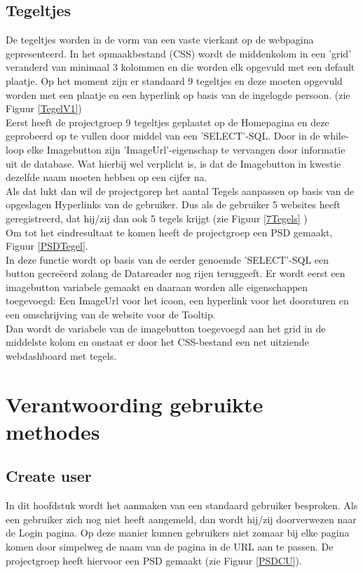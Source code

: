 \documentclass[11pt]{article}
\begin{document}
	
	
	
	\subsection{Tegeltjes}
	De tegeltjes worden in de vorm van een vaste vierkant op de webpagina gepresenteerd. 
	In het opmaakbestand (CSS) wordt de middenkolom in een 'grid' veranderd van minimaal 3 
	kolommen en die worden elk opgevuld met een default plaatje. Op het moment zijn er standaard 9 tegeltjes en deze moeten opgevuld worden met een plaatje en een hyperlink op basis van de ingelogde persoon. (zie Figuur \ref{TegelV1}) \\
		
 	Eerst heeft de projectgroep 9 tegeltjes geplaatst op de Homepagina en deze geprobeerd op te vullen door middel van een 'SELECT'-SQL. Door in de while-loop elke Imagebutton zijn 'ImageUrl'-eigenschap te vervangen door informatie uit de database. Wat hierbij wel verplicht is, is dat de Imagebutton in kwestie dezelfde naam moeten hebben op een cijfer na.\\
 	
 	Als dat lukt dan wil de projectgorep het aantal Tegels aanpassen op basis van de opgeslagen Hyperlinks van de gebruiker. Dus als de gebruiker 5 websites heeft geregistreerd, dat hij/zij dan ook 5 tegels krijgt (zie Figuur \ref{7Tegels} )\\
 	
 	Om tot het eindresultaat te komen heeft de projectgroep een PSD gemaakt, Figuur \ref{PSDTegel}.\\
 	
 	In deze functie wordt op basis van de eerder genoemde 'SELECT'-SQL een button gecreëerd zolang de Datareader nog rijen teruggeeft. Er wordt eerst een imagebutton variabele gemaakt en daaraan worden alle eigenschappen toegevoegd: Een ImageUrl voor het icoon, een hyperlink voor het doorsturen en een omschrijving van de website voor de Tooltip. \\
 	
 	Dan wordt de variabele van de imagebutton toegevoegd aan het grid in de middelste kolom en 
 	onstaat er door het CSS-bestand een net uitziende webdashboard met tegels.
 		
	
	\newpage
	
	\section{Verantwoording gebruikte methodes}
	\subsection{Create user}
	In dit hoofdstuk wordt het aanmaken van een standaard gebruiker besproken. Als een gebruiker zich nog niet heeft aangemeld, dan wordt hij/zij doorverwezen naar de Login pagina. Op deze manier kunnen gebruikers niet zomaar bij elke pagina komen door simpelweg de naam van de pagina in de URL aan te passen. De projectgroep heeft hiervoor een PSD gemaakt (zie Figuur \ref{PSDCU}).\\
	
\end{document}
